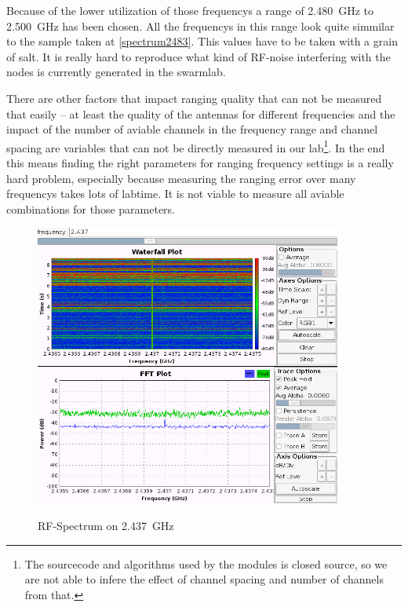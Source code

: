 Because of the lower utilization of those frequencys a range of \SI{2.480}{\giga\hertz} to \SI{2.500}{\giga\hertz} has been chosen.
All the frequencys in this range look quite simmilar to the sample taken at \autoref{spectrum2483}.
This values have to be taken with a grain of salt.
It is really hard to reproduce what kind of RF-noise interfering with the nodes is currently generated in the swarmlab.

There are other factors that impact ranging quality that can not be measured that easily – at least the quality of the antennas for different frequencies and the impact of the number of aviable channels in the frequency range and channel spacing are variables that can not be directly measured in our lab\footnote{The sourcecode and algorithms used by the modules is closed source, so we are not able to infere the effect of channel spacing and number of channels from that.}. 
In the end this means finding the right parameters for ranging frequency settings is a really hard problem, especially because measuring the ranging error over many frequencys takes lots of labtime. 
It is not viable to measure all aviable combinations for those parameters.


\begin{figure}[H]
	\centering
\includegraphics[width=0.9\textwidth]{figures/ch6.png}
\label{spectrum2437}
\caption{RF-Spectrum on \SI{2.437}{\giga\hertz}}
\end{figure}

